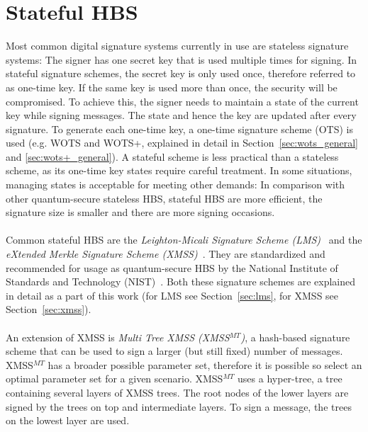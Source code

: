 \section{Stateful HBS}
Most common digital signature systems currently in use are stateless signature systems: 
The signer has one secret key that is used multiple times for signing. In stateful signature schemes, the secret key is only used once, therefore referred to as one-time key. 
If the same key is used more than once, the security will be compromised. 
To achieve this, the signer needs to maintain a state of the current key while signing messages. The state and hence the key are updated after every signature. To generate each one-time key, a one-time signature scheme (OTS) is used (e.g. WOTS and WOTS+, explained in detail in Section~\ref{sec:wots_general} and \ref{sec:wots+_general}).
A stateful scheme is less practical than a stateless scheme, as its one-time key states require careful treatment.
In some situations, managing states is acceptable for meeting other demands: In comparison with other quantum-secure stateless HBS, stateful HBS are more efficient, the signature size is smaller and there are more signing occasions.~\cite{properties_stateless_HBS_2022}
\\ \\
Common stateful HBS are the \textit{Leighton-Micali Signature Scheme (LMS)}~\cite{LMS_RFC8554} and the \textit{eXtended Merkle Signature Scheme (XMSS)}~\cite{xmss_RFC8391}. They are standardized and recommended for usage as quantum-secure HBS by the National Institute of Standards and Technology (NIST)~\cite{stateful_hashbased_sign_schemes_NIST_2020}. Both these signature schemes are explained in detail as a part of this work (for LMS see Section~\ref{sec:lms}, for XMSS see Section~\ref{sec:xmss}).
\\ \\
An extension of XMSS is \textit{Multi Tree XMSS (XMSS$^{MT}$)}, a hash-based
signature scheme that can be used to sign a larger (but still fixed) number of messages. XMSS$^{MT}$ has a broader possible parameter set, therefore it is possible so select an optimal parameter set for a given scenario.
XMSS$^{MT}$ uses a hyper-tree, a tree containing several layers of XMSS trees. The root nodes of the lower layers are signed by the trees on top and intermediate layers. To sign a message, the trees on the lowest layer are used.~\cite{xmss_multitree_2013,xmss_RFC8391}

